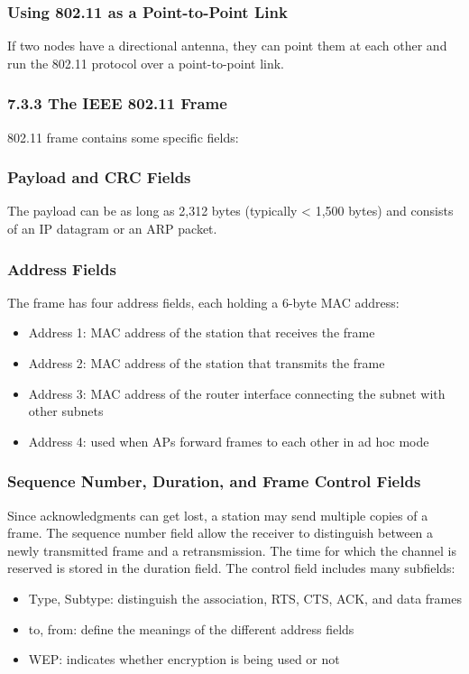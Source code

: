 \documentclass{article}
\begin{document}
\subsubsection*{Using 802.11 as a Point-to-Point Link}
If two nodes have a directional antenna, they can point them at each other and run the 802.11 protocol over a point-to-point link.
\subsubsection{7.3.3 The IEEE 802.11 Frame}
802.11 frame contains some specific fields:
\subsubsection*{Payload and CRC Fields}
The payload can be as long as 2,312 bytes (typically < 1,500 bytes) and consists of an IP datagram or an ARP packet.
\subsubsection*{Address Fields}
The frame has four address fields, each holding a 6-byte MAC address:
\begin{itemize}
    \item Address 1: MAC address of the station that receives the frame
    \item Address 2: MAC address of the station that transmits the frame
    \item Address 3: MAC address of the router interface connecting the subnet with other subnets
    \item Address 4: used when APs forward frames to each other in ad hoc mode
\end{itemize}
\subsubsection{Sequence Number, Duration, and Frame Control Fields}
Since acknowledgments can get lost, a station may send multiple copies of a frame.
The sequence number field allow the receiver to distinguish between a newly transmitted frame and a retransmission.
The time for which the channel is reserved is stored in the duration field.
The control field includes many subfields:
\begin{itemize}
    \item Type, Subtype: distinguish the association, RTS, CTS, ACK, and data frames
    \item to, from: define the meanings of the different address fields
    \item WEP: indicates whether encryption is being used or not 
\end{itemize}
\end{document}
